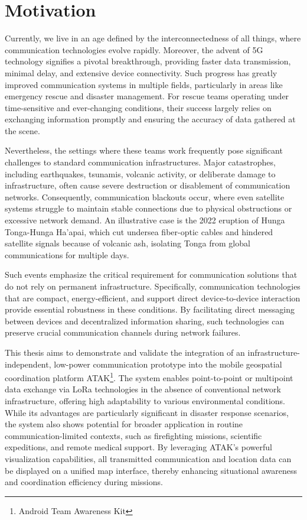 \section{Motivation}

Currently, we live in an age defined by the interconnectedness of all things, where communication technologies evolve rapidly. 
Moreover, the advent of 5G technology signifies a pivotal breakthrough, providing faster data transmission, minimal delay, and extensive device connectivity. 
Such progress has greatly improved communication systems in multiple fields, particularly in areas like emergency rescue and disaster management. 
For rescue teams operating under time-sensitive and ever-changing conditions, their success largely relies on exchanging information promptly and ensuring the accuracy of data gathered at the scene.

\par

Nevertheless, the settings where these teams work frequently pose significant challenges to standard communication infrastructures. 
Major catastrophes, including earthquakes, tsunamis, volcanic activity, or deliberate damage to infrastructure, often cause severe destruction or disablement of communication networks. 
Consequently, communication blackouts occur, where even satellite systems struggle to maintain stable connections due to physical obstructions or excessive network demand. 
An illustrative case is the 2022 eruption of Hunga Tonga-Hunga Ha'apai, which cut undersea fiber-optic cables and hindered satellite signals because of volcanic ash, isolating Tonga from global communications for multiple days.

\par

Such events emphasize the critical requirement for communication solutions that do not rely on permanent infrastructure. 
Specifically, communication technologies that are compact, energy-efficient, and support direct device-to-device interaction provide essential robustness in these conditions. 
By facilitating direct messaging between devices and decentralized information sharing, such technologies can preserve crucial communication channels during network failures.

\par

This thesis aims to demonstrate and validate the integration of an infrastructure-independent, low-power communication prototype into the mobile geospatial coordination platform ATAK\footnote{Android Team Awareness Kit}. 
The system enables point-to-point or multipoint data exchange via LoRa technologies in the absence of conventional network infrastructure, offering high adaptability to various environmental conditions. 
While its advantages are particularly significant in disaster response scenarios, the system also shows potential for broader application in routine communication-limited contexts, such as firefighting missions, scientific expeditions, and remote medical support. 
By leveraging ATAK's powerful visualization capabilities, all transmitted communication and location data can be displayed on a unified map interface, thereby enhancing situational awareness and coordination efficiency during missions.